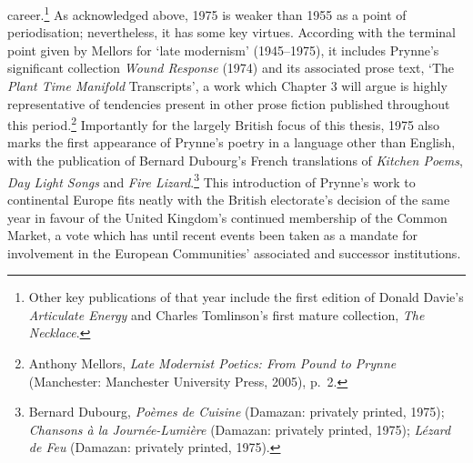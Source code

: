 \documentclass[]{article}
\begin{document}
career.\footnote{Other key publications of that year include the first
  edition of Donald Davie's \emph{Articulate Energy} and Charles
  Tomlinson's first mature collection, \emph{The Necklace}.} As
acknowledged above, 1975 is weaker than 1955 as a point of
periodisation; nevertheless, it has some key virtues. According with the
terminal point given by Mellors for `late modernism' (1945--1975), it
includes Prynne's significant collection \emph{Wound Response} (1974)
and its associated prose text, `The \emph{Plant Time Manifold}
Transcripts', a work which Chapter 3 will argue is highly representative
of tendencies present in other prose fiction published throughout this
period.\footnote{Anthony Mellors, \emph{Late Modernist Poetics: From
  Pound to Prynne} (Manchester: Manchester University Press, 2005),
  p.~2.} Importantly for the largely British focus of this thesis, 1975
also marks the first appearance of Prynne's poetry in a language other
than English, with the publication of Bernard Dubourg's French
translations of \emph{Kitchen Poems}, \emph{Day Light Songs} and
\emph{Fire Lizard}.\footnote{Bernard Dubourg, \emph{Poèmes de Cuisine}
  (Damazan: privately printed, 1975); \emph{Chansons à la
  Journée-Lumière} (Damazan: privately printed, 1975); \emph{Lézard de
  Feu} (Damazan: privately printed, 1975).} This introduction of
Prynne's work to continental Europe fits neatly with the British
electorate's decision of the same year in favour of the United Kingdom's
continued membership of the Common Market, a vote which has until recent
events been taken as a mandate for involvement in the European
Communities' associated and successor institutions.
\end{document}
